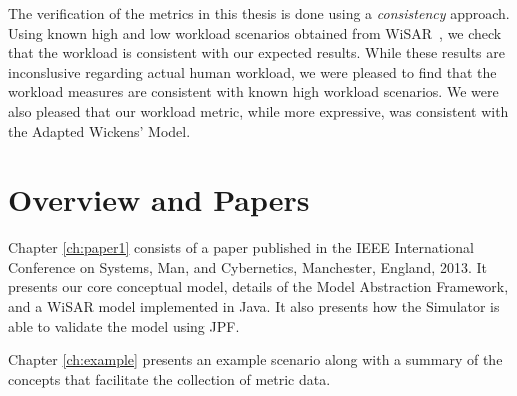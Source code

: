 The verification of the metrics in this thesis is done using a {\em consistency} approach.  Using known high and low workload scenarios obtained from WiSAR~\cite{Adams2009Cognitive}, we check that the workload is consistent with our expected results.  While these results are inconslusive regarding actual human workload, we were pleased to find that the workload measures are consistent with known high workload scenarios.  We were also pleased that our workload metric, while more expressive, was consistent with the Adapted Wickens' Model.

\begin{comment}
   Known high and low workload scenarios, similar to those in WiSAR, are placed in the model.  Workload is consistent if it rises and falls as expected given known scenarios, and a {\em sensitivity}We were very pleased with the results of this case study.  Firstly because the Model Abstraction Framework proved capable of expressing our highly abstracted model.  Second, by using a {\em consistency}

using the Workload Viewer we were able to show that the Model Abstraction Framework is capable of expressing a UAS using high levels of abstraction.  The results of   They also demonstrate the ability to model systems using varying degrees of abstraction.  The verification of the metrics in this thesis is done by a {\em consistency} approach, showing that workload rises and falls as expected given known difficult and easy scenarios, respectively.  Future work will provide a more detailed verification.
\end{comment}

\section{Overview and Papers}

Chapter \ref{ch:paper1} consists of a paper published in the IEEE International Conference on Systems, Man, and Cybernetics, Manchester, England, 2013. It presents our core conceptual model, details of the Model Abstraction Framework, and a WiSAR model implemented in Java.  It also presents how the Simulator is able to validate the model using JPF.

Chapter \ref{ch:example} presents an example scenario along with a summary of the concepts that facilitate the collection of metric data.
\begin{comment}
Chapter 3 presents an extension of our conceptual model in the form of the DiTG.  It also presents a formal taxonomy of workload metrics and how that taxonomy applies to our conceptual model.  Lastly it reports the results of adding the workload metrics into the simulation framework.  Much of the work performed for this paper was completed by others; it has been added to this thesis for completeness.


Chapter 4 presents an XML Model Extension for the Model Abstraction Framework which makes it easier for the modeler to create a labeled state transition system and reduces the likelihood of coding errors in the resulting Java implementation of that system.
\end{comment}

